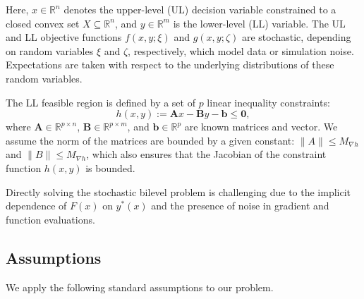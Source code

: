 \documentclass[letterpaper]{article} %
\newcommand{\1}{\mathbf{1}}
\begin{document}
Here, $x \in \mathbb{R}^n$ denotes the upper-level (UL) decision variable constrained to a closed convex set $X \subseteq \mathbb{R}^n$, and $y \in \mathbb{R}^m$ is the lower-level (LL) variable. The UL and LL objective functions $f(x, y; \xi)$ and $g(x, y; \zeta)$ are stochastic, depending on random variables $\xi$ and $\zeta$, respectively, which model data or simulation noise. Expectations are taken with respect to the underlying distributions of these random variables.

The LL feasible region is defined by a set of $p$ linear inequality constraints:
\begin{equation}
h(x, y) := \mathbf{A} x - \mathbf{B} y - \mathbf{b} \leq \mathbf{0},
\end{equation}
where $\mathbf{A} \in \mathbb{R}^{p \times n}$, $\mathbf{B} \in \mathbb{R}^{p \times m}$, and $\mathbf{b} \in \mathbb{R}^p$ are known matrices and vector. We assume the norm of the matrices are bounded by a given constant: $\| A \| \leq M_{\nabla h}$ and $\| B \| \leq M_{\nabla h}$, which also ensures that the Jacobian of the constraint function $h(x,y)$ is bounded. %

Directly solving the stochastic bilevel problem is challenging due to the implicit dependence of $F(x)$ on $y^*(x)$ and the presence of noise in gradient and function evaluations.

\subsection{Assumptions}

We apply the following standard assumptions to our problem.
\end{document}
